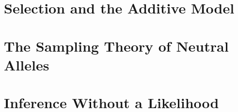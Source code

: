 \documentclass[11pt,openright,twoside]{book}
\theoremstyle{bookplain}
\theoremstyle{bookdef}
\numberwithin{equation}{chapter}
\numberwithin{figure}{chapter}
\numberwithin{table}{chapter}
\newcommand{\resetmacros}{%
  \DeclareRobustCommand{\E}{\mathbb{E}}%
  \DeclareRobustCommand{\Prob}{\mathbb{P}}%
  \DeclareRobustCommand{\R}{\mathbb{R}}%
  \DeclareRobustCommand{\N}{\mathbb{N}}%
  \DeclareRobustCommand{\Var}{\operatorname{Var}}%
  \DeclareRobustCommand{\Cov}{\operatorname{Cov}}%
  \DeclareRobustCommand{\dd}{\,\mathrm{d}}%
  \DeclareRobustCommand{\Pr}{\operatorname{Pr}}%
}
\newcommand{\chapterfile}[1]{\resetmacros\clearpage}
\begin{document}


\mainmatter

\chapterfile{intro}
\chapterfile{toolkit}

\part{Selection and the Additive Model}
\chapterfile{ftns}
\chapterfile{hs}
\chapterfile{mp}

\part{The Sampling Theory of Neutral Alleles}
\chapterfile{esf}
\chapterfile{py}
\chapterfile{pig}
\chapterfile{rc}

\part{Inference Without a Likelihood}
\chapterfile{suff}
\chapterfile{coal}

\chapterfile{future}
\end{document}
